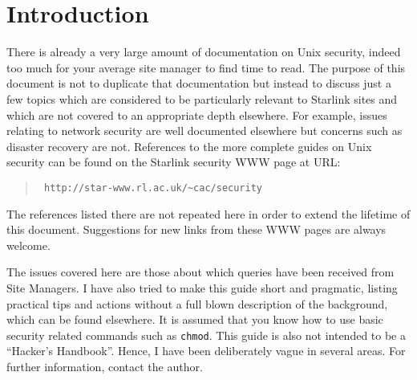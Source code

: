  \begin{latexonly}
   \setlength{\parskip}{0mm}
   \latexonlytoc
   \setlength{\parskip}{\medskipamount}
   \markright{\stardocname}
 \end{latexonly}
\newpage
\renewcommand{\thepage}{\arabic{page}}

\section{\label{introduction}Introduction} 

There is already a very large amount of documentation on Unix security,
indeed too much for your average site manager to find time to read. The
purpose of this document is not to duplicate that documentation but
instead to discuss just a few topics which are considered to be
particularly relevant to Starlink sites and which are not covered to an
appropriate depth elsewhere. For example, issues relating to network
security are well documented elsewhere but concerns such as disaster
recovery are not. References to the more complete guides on Unix
security can be found on the Starlink security WWW page at URL:

\begin{quote}{\tt
{}
{http://star-www.rl.ac.uk/\~{}cac/security}}
\end{quote}

The references listed there are not repeated here in order to extend the
lifetime of this document. Suggestions for new links from these WWW pages
are always welcome.

The issues covered here are those about which queries have been
received from Site Managers. I have also tried to make this guide short
and pragmatic, listing practical tips and actions without a full blown
description of the background, which can be found elsewhere. It is
assumed that you know how to use basic security related commands such
as {\tt chmod}. This guide is also not intended to be a ``Hacker's
Handbook''. Hence, I have been deliberately vague in several
areas. For further information, contact the author.

